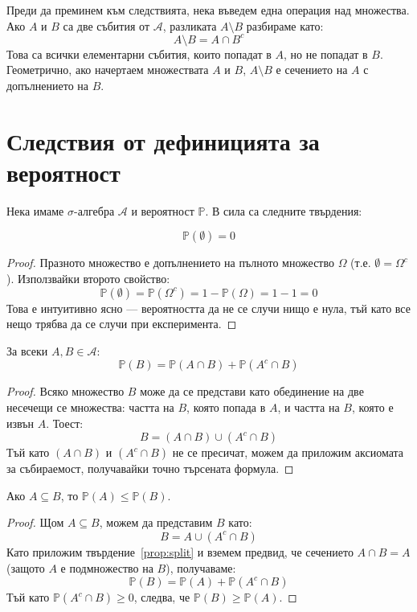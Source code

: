 Преди да преминем към следствията, нека въведем една операция над множества. Ако $A$ и $B$ са две събития от $\mathcal{A}$, разликата $A \setminus B$ разбираме като:
\[ A \setminus B = A \cap B^c \]
Това са всички елементарни събития, които попадат в $A$, но не попадат в $B$. Геометрично, ако начертаем множествата $A$ и $B$, $A \setminus B$ е сечението на $A$ с допълнението на $B$.

\section{Следствия от дефиницията за вероятност}

Нека имаме $\sigma$-алгебра $\mathcal{A}$ и вероятност $\mathbb{P}$. В сила са следните твърдения:

\begin{prop}\label{prop:empty}
\[ \mathbb{P}(\emptyset) = 0 \]
\end{prop}
\begin{proof}
Празното множество е допълнението на пълното множество $\Omega$ (т.е. $\emptyset = \Omega^c$). Използвайки второто свойство:
\[ \mathbb{P}(\emptyset) = \mathbb{P}(\Omega^c) = 1 - \mathbb{P}(\Omega) = 1 - 1 = 0 \]
Това е интуитивно ясно — вероятността да не се случи нищо е нула, тъй като все нещо трябва да се случи при експеримента.
\end{proof}

\begin{prop}\label{prop:split}
За всеки $A, B \in \mathcal{A}$:
\[ \mathbb{P}(B) = \mathbb{P}(A \cap B) + \mathbb{P}(A^c \cap B) \]
\end{prop}
\begin{proof}
Всяко множество $B$ може да се представи като обединение на две несечещи се множества: частта на $B$, която попада в $A$, и частта на $B$, която е извън $A$. Тоест:
\[ B = (A \cap B) \cup (A^c \cap B) \]
Тъй като $(A \cap B)$ и $(A^c \cap B)$ не се пресичат, можем да приложим аксиомата за събираемост, получавайки точно търсената формула.
\end{proof}

\begin{prop}\label{prop:monotone}
Ако $A \subseteq B$, то $\mathbb{P}(A) \le \mathbb{P}(B)$.
\end{prop}
\begin{proof}
Щом $A \subseteq B$, можем да представим $B$ като:
\[ B = A \cup (A^c \cap B) \]
Като приложим твърдение~\ref{prop:split} и вземем предвид, че сечението $A \cap B = A$ (защото $A$ е подмножество на $B$), получаваме:
\[ \mathbb{P}(B) = \mathbb{P}(A) + \mathbb{P}(A^c \cap B) \]
Тъй като $\mathbb{P}(A^c \cap B) \ge 0$, следва, че $\mathbb{P}(B) \ge \mathbb{P}(A)$.
\end{proof}

